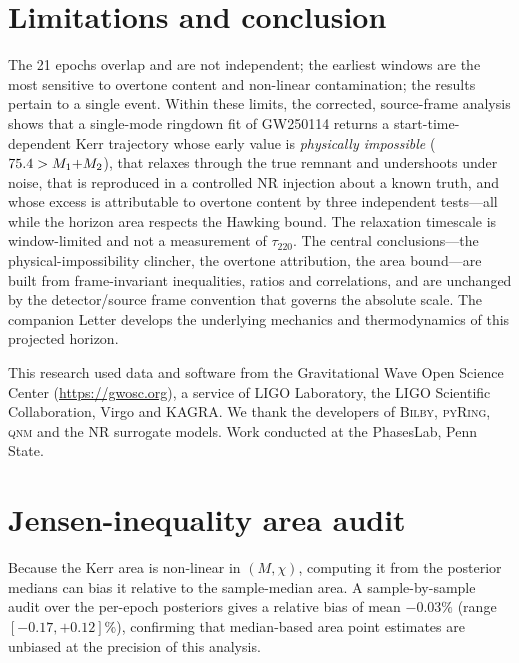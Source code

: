 \documentclass[aps,prd,twocolumn,superscriptaddress,nofootinbib,longbibliography]{revtex4-2}
\begin{document}
\section{Limitations and conclusion}
The 21 epochs overlap and are not independent; the earliest windows are the most
sensitive to overtone content and non-linear contamination; the results pertain
to a single event. Within these limits, the corrected, source-frame analysis
shows that a single-mode ringdown fit of GW250114 returns a start-time-dependent
Kerr trajectory whose early value is \emph{physically impossible}
($75.4>M_1{+}M_2$), that relaxes through the true remnant and undershoots
under noise, that is reproduced in a controlled NR injection about a known
truth, and whose excess is attributable to overtone content by three independent
tests---all while the horizon area respects the Hawking bound. The relaxation
timescale is window-limited and not a measurement of $\tau_{220}$. The central
conclusions---the physical-impossibility clincher, the overtone attribution, the
area bound---are built from frame-invariant inequalities, ratios and
correlations, and are unchanged by the detector/source frame convention that
governs the absolute scale. The companion Letter \cite{Companion2026} develops
the underlying mechanics and thermodynamics of this projected horizon.

\begin{acknowledgments}
This research used data and software from the Gravitational Wave Open Science
Center (\url{https://gwosc.org}), a service of LIGO Laboratory, the LIGO
Scientific Collaboration, Virgo and KAGRA. We thank the developers of
\textsc{Bilby}, \textsc{pyRing}, \textsc{qnm} and the NR surrogate models. Work
conducted at the PhasesLab, Penn State.
\end{acknowledgments}

\appendix
\section{Jensen-inequality area audit}
Because the Kerr area is non-linear in $(M,\chi)$, computing it from the
posterior medians can bias it relative to the sample-median area. A
sample-by-sample audit over the per-epoch posteriors gives a relative bias of
mean $-0.03\%$ (range $[-0.17,+0.12]\%$), confirming that median-based area
point estimates are unbiased at the precision of this analysis.
\end{document}
